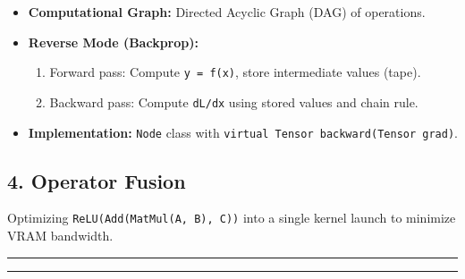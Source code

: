 \begin{itemize}
\tightlist
\item
  \textbf{Computational Graph:} Directed Acyclic Graph (DAG) of
  operations.
\item
  \textbf{Reverse Mode (Backprop):}

  \begin{enumerate}
  \def\labelenumi{\arabic{enumi}.}
  \tightlist
  \item
    Forward pass: Compute \passthrough{\lstinline!y = f(x)!}, store
    intermediate values (tape).
  \item
    Backward pass: Compute \passthrough{\lstinline!dL/dx!} using stored
    values and chain rule.
  \end{enumerate}
\item
  \textbf{Implementation:} \passthrough{\lstinline!Node!} class with
  \passthrough{\lstinline!virtual Tensor backward(Tensor grad)!}.
\end{itemize}

\hypertarget{operator-fusion}{%
\subsection{4. Operator Fusion}\label{operator-fusion}}

Optimizing \passthrough{\lstinline!ReLU(Add(MatMul(A, B), C))!} into a
single kernel launch to minimize VRAM bandwidth.

\begin{center}\rule{0.5\linewidth}{0.5pt}\end{center}

\begin{center}\rule{0.5\linewidth}{0.5pt}\end{center}
